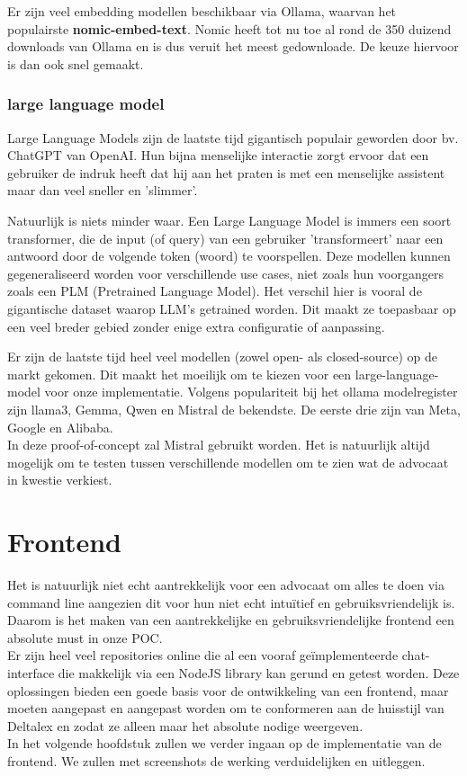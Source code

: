 Er zijn veel embedding modellen beschikbaar via Ollama, waarvan het populairste \textbf{nomic-embed-text}. 
Nomic heeft tot nu toe al rond de 350 duizend downloads van Ollama en is dus veruit het meest gedownloade. 
De keuze hiervoor is dan ook snel gemaakt. 

\subsubsection{large language model}
Large Language Models zijn de laatste tijd gigantisch populair geworden door bv. ChatGPT van OpenAI.
Hun bijna menselijke interactie zorgt ervoor dat een gebruiker de indruk heeft dat hij aan het praten is met een menselijke assistent maar dan veel sneller en 'slimmer'.

Natuurlijk is niets minder waar.
Een Large Language Model is immers een soort transformer, die de input (of query) van een gebruiker 'transformeert' naar een antwoord door de volgende token (woord) te voorspellen.
Deze modellen kunnen gegeneraliseerd worden voor verschillende use cases, niet zoals hun voorgangers zoals een PLM (Pretrained Language Model).
Het verschil hier is vooral de gigantische dataset waarop LLM's getrained worden.
Dit maakt ze toepasbaar op een veel breder gebied zonder enige extra configuratie of aanpassing.

Er zijn de laatste tijd heel veel modellen (zowel open- als closed-source) op de markt gekomen. Dit maakt het moeilijk om te kiezen voor een large-language-model voor onze implementatie. 
Volgens populariteit bij het ollama modelregister zijn llama3, Gemma, Qwen en Mistral de bekendste. De eerste drie zijn van Meta, Google en Alibaba. \\

In deze proof-of-concept zal Mistral gebruikt worden. Het is natuurlijk altijd mogelijk om te testen tussen verschillende modellen om te zien wat de advocaat in kwestie verkiest. 

\section{Frontend}
Het is natuurlijk niet echt aantrekkelijk voor een advocaat om alles te doen via command line aangezien dit voor hun niet echt intuïtief en gebruiksvriendelijk is. 
Daarom is het maken van een aantrekkelijke en gebruiksvriendelijke frontend een absolute must in onze POC. \\ 

Er zijn heel veel repositories online die al een vooraf geïmplementeerde chat-interface die makkelijk via een NodeJS library kan gerund en getest worden. 
Deze oplossingen bieden een goede basis voor de ontwikkeling van een frontend, maar moeten aangepast en aangepast worden om te conformeren aan de huisstijl van Deltalex en zodat ze alleen maar het absolute nodige weergeven. \\

In het volgende hoofdstuk zullen we verder ingaan op de implementatie van de frontend. 
We zullen met screenshots de werking verduidelijken en uitleggen. 
